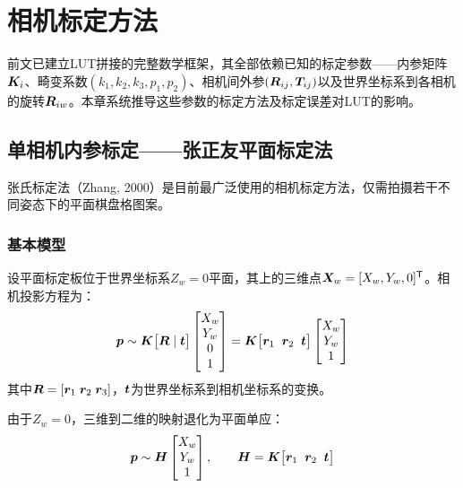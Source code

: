 \section{相机标定方法}
\label{sec:calibration}

前文已建立LUT拼接的完整数学框架，其全部依赖已知的标定参数——内参矩阵$\bm{K}_i$、畸变系数$(k_1,k_2,k_3,p_1,p_2)$、相机间外参$(\bm{R}_{ij},\bm{T}_{ij})$以及世界坐标系到各相机的旋转$\bm{R}_{iw}$。本章系统推导这些参数的标定方法及标定误差对LUT的影响。

\subsection{单相机内参标定——张正友平面标定法}
\label{sec:zhang}

张氏标定法（Zhang, 2000）是目前最广泛使用的相机标定方法，仅需拍摄若干不同姿态下的平面棋盘格图案。

\subsubsection{基本模型}

设平面标定板位于世界坐标系$Z_w=0$平面，其上的三维点$\bm{X}_w = [X_w, Y_w, 0]^{\mathsf{T}}$。相机投影方程为：
\begin{equation}
\bm{p} \sim \bm{K}\bigl[\bm{R} \mid \bm{t}\bigr]
\begin{bmatrix}
X_w \\ Y_w \\ 0 \\ 1
\end{bmatrix}
= \bm{K}\bigl[\bm{r}_1 \;\; \bm{r}_2 \;\; \bm{t}\bigr]
\begin{bmatrix}
X_w \\ Y_w \\ 1
\end{bmatrix}
\label{eq:zhang-proj}
\end{equation}
其中$\bm{R} = [\bm{r}_1\; \bm{r}_2\; \bm{r}_3]$，$\bm{t}$为世界坐标系到相机坐标系的变换。

由于$Z_w=0$，三维到二维的映射退化为平面单应：
\begin{equation}
\bm{p} \sim \bm{H}
\begin{bmatrix}
X_w \\ Y_w \\ 1
\end{bmatrix},
\qquad
\bm{H} = \bm{K}\bigl[\bm{r}_1 \;\; \bm{r}_2 \;\; \bm{t}\bigr]
\label{eq:zhang-H}
\end{equation}

